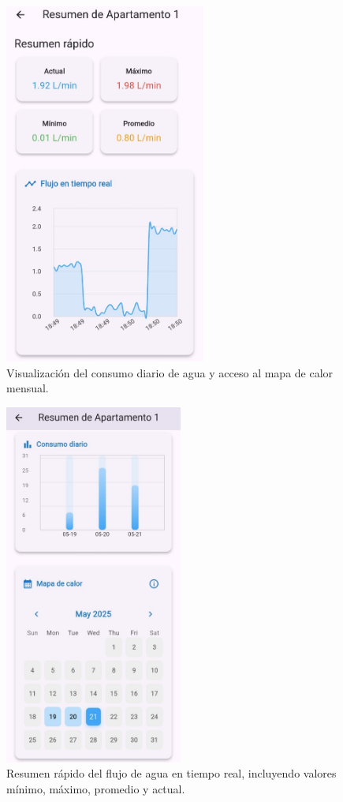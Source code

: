 \documentclass[conference]{IEEEtran}
\begin{document}
\begin{figure}[htbp]
    \centerline{\includegraphics[width=\linewidth, height=450px]{Prototipo5.jpeg}}
    \caption{Visualización del consumo diario de agua y acceso al mapa de calor mensual.}
    \label{fig}
\end{figure}

\begin{figure}[htbp]
    \centerline{\includegraphics[width=\linewidth, height=450px]{Prototipo6.jpeg}}
    \caption{Resumen rápido del flujo de agua en tiempo real, incluyendo valores mínimo, máximo, promedio y actual.}
    \label{fig}
\end{figure}
\end{document}
